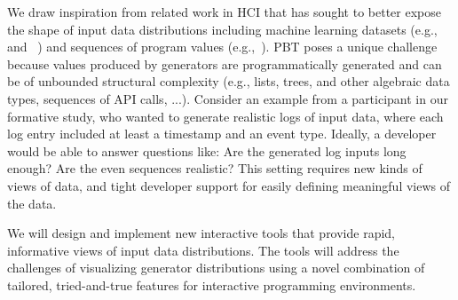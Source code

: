We draw inspiration from related work in HCI that has sought to better expose
the shape of input data distributions including
machine learning datasets
(e.g.,~\cite{ref:hohman2019gamut} and
~\cite{ref:hohman2020understanding}) and sequences of program values
(e.g.,~\cite{ref:kang2017omnicode}).
PBT poses a unique challenge because values produced by generators are
programmatically generated and
can be of unbounded structural
complexity (e.g., lists, trees, and other algebraic data types,
sequences of API calls, ...).
Consider an
example from a participant in our formative study, who wanted to generate
realistic logs of input data, where each log entry included at least a timestamp
and an event type.
Ideally, a developer would be able to answer
questions like: Are the generated log inputs long enough? Are the even sequences
realistic? This setting requires new kinds of views of data, and tight
developer support for easily defining meaningful views of the data.

We will design and implement new interactive tools that provide rapid,
informative views of input data distributions. The tools will address the
challenges of visualizing generator distributions using a novel combination of
tailored, tried-and-true features for interactive programming environments.


